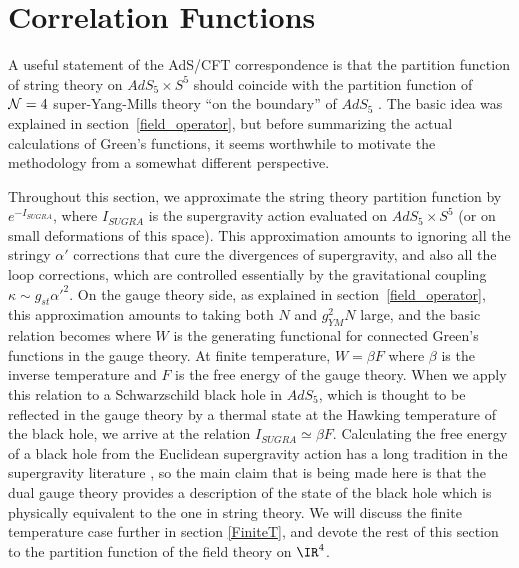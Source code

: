 \section{Correlation Functions}
\label{correlators}

A useful statement of the AdS/CFT correspondence is that the partition
function of string theory on $AdS_5 \times S^5$ should coincide with the
partition function of ${\cal N}=4$ super-Yang-Mills theory ``on the
boundary'' of $AdS_5$ \cite{Gubser:1998bc,Witten:1998qj}.  The basic idea
was explained in section~\ref{field_operator}, but before summarizing the
actual calculations of Green's functions, it seems worthwhile to motivate
the methodology from a somewhat different perspective.

Throughout this section, we approximate the string theory partition
function by $e^{-I_{SUGRA}}$, where $I_{SUGRA}$ is the supergravity action
evaluated on $AdS_5 \times S^5$ (or on small deformations of this space).
This approximation amounts to ignoring all the stringy $\alpha'$
corrections that cure the divergences of supergravity, and also all the
loop corrections, which are controlled essentially by the gravitational
coupling $\kappa \sim g_{st} \alpha'^2$.  On the gauge theory side, as
explained in section~\ref{field_operator}, this approximation amounts to
taking both $N$ and $g_{YM}^2 N$ large, and the basic relation becomes
        where $W$ is the generating functional for connected Green's
        functions in the gauge theory.  At finite temperature,
        $W = \beta F$ where $\beta$ is the inverse temperature and
        $F$ is the free energy of the gauge theory.
 When we apply this relation to a Schwarzschild black hole in
$AdS_5$, which is thought to be reflected in the gauge theory by a thermal
state at the Hawking temperature of the black hole, we arrive at the
relation $I_{SUGRA} \simeq \beta F$.  Calculating the free energy of a black
hole from the Euclidean supergravity action has a long tradition in the
supergravity literature \cite{Gibbons:1978ac}, so the main claim that is
being made here is that the dual gauge theory
provides a description of the state of the black hole which is physically
equivalent to the one in string theory. We will discuss the finite
temperature case further in section \ref{FiniteT}, and devote the rest
of this section to the partition function of the field theory on $\IR^4$.

